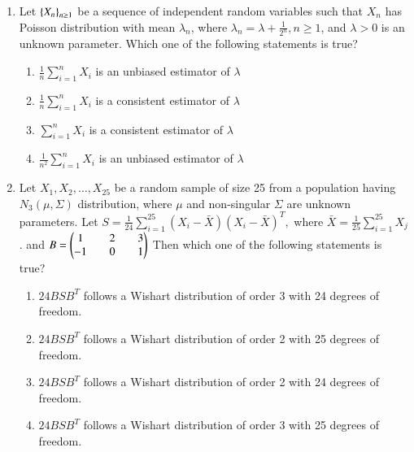 \documentclass[journal,12pt,onecolumn]{IEEEtran}
\theoremstyle{remark}
\begin{document}
\begin{enumerate}
\begin{enumerate}
\end{enumerate}

\item Let $\left\{X_{n}\right\}_{n \geq 1}$ be a sequence of independent random variables such that $X_{n}$ has Poisson distribution with mean $\lambda_{n}$, where $\lambda_{n} = \lambda + \frac{1}{2^{n}}, n \geq 1 $, and $\lambda > 0$ is an unknown parameter. Which one of the following statements is true?
\begin{enumerate}
\item $\frac{1}{n} \sum_{i=1}^{n} X_{i}$ is an unbiased estimator of $\lambda$
\item $\frac{1}{n} \sum_{i=1}^{n} X_{i}$ is a consistent estimator of $\lambda$
\item $\sum_{i=1}^{n} X_{i}$ is a consistent estimator of $\lambda$
\item $\frac{1}{n^{2}} \sum_{i=1}^{n} X_{i}$ is an unbiased estimator of $\lambda$
\end{enumerate}

\item Let $X_1, X_2, \dots, X_{25}$  be a random sample of size 25 from a population having $N_3(\mu, \Sigma)$ distribution, where $\mu$ and non-singular $\Sigma$ are unknown parameters. Let $S = \frac{1}{24} \sum_{i=1}^{25} (X_i - \bar{X})(X_i - \bar{X})^T,$
where $\bar{X} = \frac{1}{25} \sum_{i=1}^{25} X_j$. and
$B = \begin{pmatrix} 1 && 2 && 3 \\ -1 && 0 && 1 \end{pmatrix}$ Then which one of the following statements is true?

\begin{enumerate}
    \item $24 BS{B}^{T}$ follows a Wishart distribution of order 3 with 24 degrees of freedom.
    \item $24 BS{B}^{T}$ follows a Wishart distribution of order 2 with 25 degrees of freedom.
    \item $24 BS{B}^{T}$ follows a Wishart distribution of order 2 with 24 degrees of freedom.
    \item $24 BS{B}^{T}$ follows a Wishart distribution of order 3 with 25 degrees of freedom.
\end{enumerate}


\end{enumerate}
\end{document}
